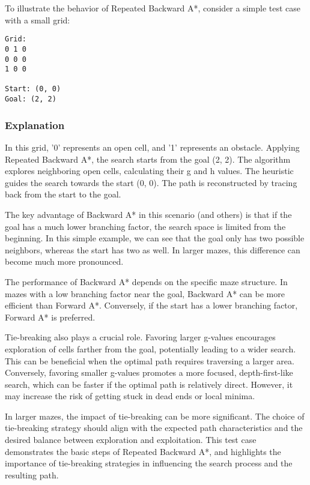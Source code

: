 \documentclass[12pt]{article}
\begin{document}
To illustrate the behavior of Repeated Backward A*, 
consider a simple test case with a small grid:

\begin{verbatim}
Grid:
0 1 0
0 0 0
1 0 0

Start: (0, 0)
Goal: (2, 2)

\end{verbatim}

\subsubsection{Explanation}

In this grid, 
'0' represents an open cell, 
and '1' represents an obstacle. 
Applying Repeated Backward A*, 
the search starts from the goal (2, 2). 
The algorithm explores neighboring open cells, 
calculating their g and h values. 
The heuristic guides the search towards the start (0, 0). 
The path is reconstructed by tracing back from the start to the goal.

The key advantage of Backward A* in this scenario 
(and others) 
is that if the goal has a much lower branching factor, 
the search space is limited from the beginning. 
In this simple example, 
we can see that the goal only has two possible neighbors, 
whereas the start has two as well. 
In larger mazes, 
this difference can become much more pronounced.

The performance of Backward A* depends on the specific maze structure. 
In mazes with a low branching factor near the goal, 
Backward A* can be more efficient than Forward A*. 
Conversely, 
if the start has a lower branching factor, 
Forward A* is preferred.

Tie-breaking also plays a crucial role. 
Favoring larger g-values encourages exploration of cells farther from the goal, 
potentially leading to a wider search. 
This can be beneficial when the optimal path requires traversing a larger area. 
Conversely, 
favoring smaller g-values promotes a more focused, 
depth-first-like search, 
which can be faster if the optimal path is relatively direct. 
However, 
it may increase the risk of getting stuck in dead ends or local minima.

In larger mazes, 
the impact of tie-breaking can be more significant. 
The choice of tie-breaking strategy should align with the expected path characteristics and the desired balance between exploration and exploitation. 
This test case demonstrates the basic steps of Repeated Backward A*,
and highlights the importance of tie-breaking strategies in influencing the search process and the resulting path.
\end{document}

